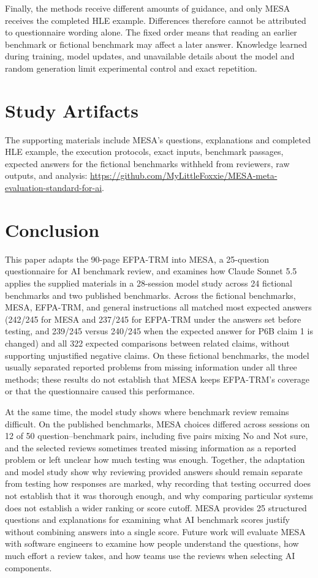 \documentclass[10pt,conference]{IEEEtran}
\begin{document}
Finally, the methods receive different amounts of guidance, and only MESA receives the completed HLE example. Differences therefore cannot be attributed to questionnaire wording alone. The fixed order means that reading an earlier benchmark or fictional benchmark may affect a later answer. Knowledge learned during training, model updates, and unavailable details about the model and random generation limit experimental control and exact repetition.

\section{Study Artifacts}
The supporting materials include MESA's questions, explanations and completed HLE example, the execution protocols, exact inputs, benchmark passages, expected answers for the fictional benchmarks withheld from reviewers, raw outputs, and analysis: \url{https://github.com/MyLittleFoxxie/MESA-meta-evaluation-standard-for-ai}.

\section{Conclusion}
This paper adapts the 90-page EFPA-TRM into MESA, a 25-question questionnaire for AI benchmark review, and examines how Claude Sonnet 5.5 applies the supplied materials in a 28-session model study across 24 fictional benchmarks and two published benchmarks. Across the fictional benchmarks, MESA, EFPA-TRM, and general instructions all matched most expected answers (242/245 for MESA and 237/245 for EFPA-TRM under the answers set before testing, and 239/245 versus 240/245 when the expected answer for P6B claim 1 is changed) and all 322 expected comparisons between related claims, without supporting unjustified negative claims. On these fictional benchmarks, the model usually separated reported problems from missing information under all three methods; these results do not establish that MESA keeps EFPA-TRM's coverage or that the questionnaire caused this performance.

At the same time, the model study shows where benchmark review remains difficult. On the published benchmarks, MESA choices differed across sessions on 12 of 50 question--benchmark pairs, including five pairs mixing No and Not sure, and the selected reviews sometimes treated missing information as a reported problem or left unclear how much testing was enough. Together, the adaptation and model study show why reviewing provided answers should remain separate from testing how responses are marked, why recording that testing occurred does not establish that it was thorough enough, and why comparing particular systems does not establish a wider ranking or score cutoff. MESA provides 25 structured questions and explanations for examining what AI benchmark scores justify without combining answers into a single score. Future work will evaluate MESA with software engineers to examine how people understand the questions, how much effort a review takes, and how teams use the reviews when selecting AI components.
\end{document}
